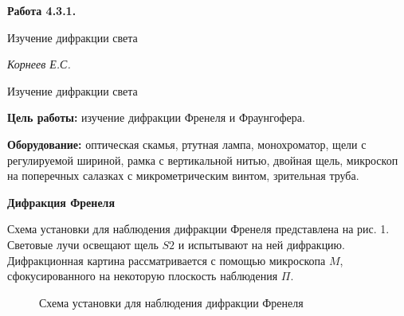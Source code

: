 \documentclass[14pt]{article}
\begin{document}
\begin{titlepage}
	\begin{center}
		\fontsize{18pt}{20pt}\selectfont
		\textbf{Работа 4.3.1.}	
	
		\vspace{5cm}
		\fontsize{24pt}{25pt}\selectfont
		Изучение дифракции света
	\end{center}
	\begin{flushright}
		\fontsize{18pt}{20pt}\selectfont
		\vspace{14cm}
		\hspace{-3cm}
		\textit{Корнеев Е.С.}
	\end{flushright}		
\end{titlepage}

\begin{center}
	\fontsize{16pt}{18pt}\selectfont	
	Изучение дифракции света
\end{center}


\fontsize{14pt}{16pt}\selectfont
\vspace{1cm}
\textbf{Цель работы:} изучение дифракции Френеля и Фраунгофера.

\vspace{0.5cm}
\textbf{Оборудование:} оптическая скамья, ртутная лампа, монохроматор, щели с регулируемой шириной, рамка с вертикальной нитью, двойная щель, микроскоп на поперечных салазках с микрометрическим винтом, зрительная труба.

\vspace{1cm}
\textbf{Дифракция Френеля}

Схема установки для наблюдения дифракции Френеля представлена на рис. 1. Световые лучи освещают щель $S2$ и испытывают на ней дифракцию. Дифракционная картина рассматривается с помощью микроскопа $M$, сфокусированного на некоторую плоскость наблюдения $\Pi$.

\begin{figure}[h!]
	\caption{Схема установки для наблюдения дифракции Френеля}
	\label{fig:image}
\end{figure}
\end{document}
